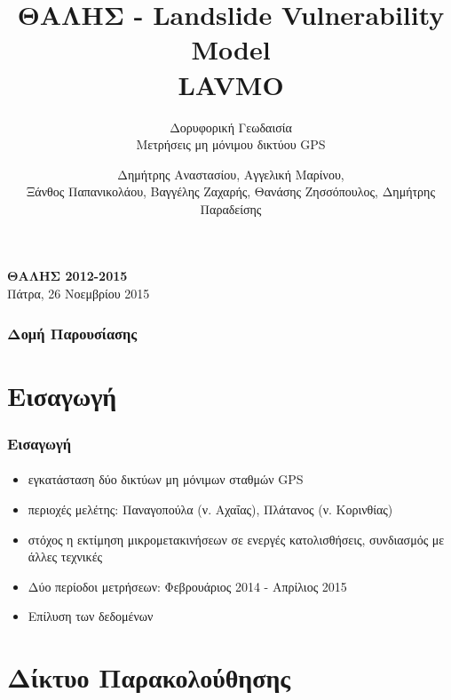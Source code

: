 \documentclass{beamer}
\title{ΘΑΛΗΣ - Landslide Vulnerability Model \\ LAVMO}
\subtitle{Δορυφορική Γεωδαισία \\ Μετρήσεις μη μόνιμου δικτύου GPS}
\date{}
\author{Δημήτρης Αναστασίου, Αγγελική Μαρίνου,\\ Ξάνθος Παπανικολάου, Βαγγέλης Ζαχαρής, Θανάσης Ζησσόπουλος, Δημήτρης Παραδείσης}
\institute{Εθνικό Μετσόβιο Πολυτεχνείο\\Κέντρο Δορυφόρων Διονύσου\\\url{http://dionysos.survey.ntua.gr}}
\begin{document}

\begin{frame}[plain]
\maketitle
\begin{block}{}
    \begin{center}
      \textbf{ΘΑΛΗΣ 2012-2015}\\
    Πάτρα, 26 Νοεμβρίου 2015 \\
    \end{center}
\end{block}
\end{frame}

\begin{frame}
    \frametitle{Δομή Παρουσίασης}
    \tableofcontents
\end{frame}

\section{Εισαγωγή}

\begin{frame}\frametitle{Εισαγωγή}\framesubtitle{}
\begin{itemize}
	\item εγκατάσταση δύο δικτύων μη μόνιμων σταθμών GPS 
	\item περιοχές μελέτης: Παναγοπούλα (ν. Αχαΐας), Πλάτανος (ν. Κορινθίας)
	\item στόχος η εκτίμηση μικρομετακινήσεων σε ενεργές κατολισθήσεις, συνδιασμός με άλλες τεχνικές
	\item Δύο περίοδοι μετρήσεων: Φεβρουάριος 2014 - Απρίλιος 2015
	\item Επίλυση των δεδομένων
\end{itemize}

\end{frame}


\section{Δίκτυο Παρακολούθησης}
\end{document}
